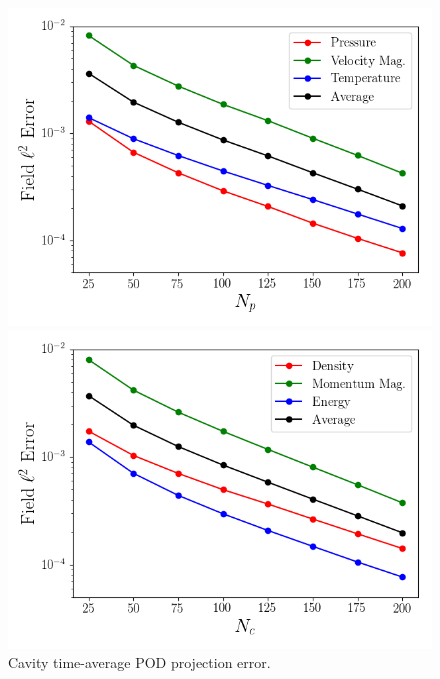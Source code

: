 \begin{figure}
	\begin{minipage}{0.49\linewidth}
		\includegraphics[width=0.99\linewidth,trim={0.5em 0.5em 0.5em 0.5em},clip]{Chapters/CavityAndCVRC/Images/cavity/projection_error_primitive.png}
	\end{minipage}
	\begin{minipage}{0.49\linewidth}
		\includegraphics[width=0.99\linewidth,trim={0.5em 0.5em 0.5em 0.5em},clip]{Chapters/CavityAndCVRC/Images/cavity/projection_error_conservative.png}
	\end{minipage}
	\caption{\label{fig:cavityProjErr}Cavity time-average POD projection error.}
\end{figure}

